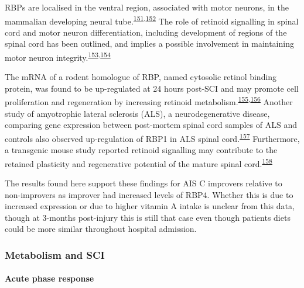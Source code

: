 \documentclass[
]{article}
\begin{document}
RBPs are localised in the ventral region, associated with motor neurons, in the mammalian developing neural tube.\textsuperscript{\protect\hyperlink{ref-pierani_sonic_1999}{151},\protect\hyperlink{ref-maden_retinoid-binding_1990}{152}}
The role of retinoid signalling in spinal cord and motor neuron differentiation, including development of regions of the spinal cord has been outlined, and implies a possible involvement in maintaining motor neuron integrity.\textsuperscript{\protect\hyperlink{ref-colbert_retinoid_1995}{153},\protect\hyperlink{ref-sockanathan_motor_1998}{154}}

The mRNA of a rodent homologue of RBP, named cytosolic retinol binding protein, was found to be up-regulated at 24 hours post-SCI and may promote cell proliferation and regeneration by increasing retinoid metabolism.\textsuperscript{\protect\hyperlink{ref-song_genechip_2001}{155},\protect\hyperlink{ref-hurst_complexity_1999}{156}}
Another study of amyotrophic lateral sclerosis (ALS), a neurodegenerative disease, comparing gene expression between post-mortem spinal cord samples of ALS and controls also observed up-regulation of RBP1 in ALS spinal cord.\textsuperscript{\protect\hyperlink{ref-malaspina_differential_2001}{157}}
Furthermore, a transgenic mouse study reported retinoid signalling may contribute to the retained plasticity and regenerative potential of the mature spinal cord.\textsuperscript{\protect\hyperlink{ref-haskell_retinoic_2002}{158}}

The results found here support these findings for AIS C improvers relative to non-improvers as improver had increased levels of RBP4.
Whether this is due to increased expression or due to higher vitamin A intake is unclear from this data, though at 3-months post-injury this is still that case even though patients diets could be more similar throughout hospital admission.

\hypertarget{metabolism-and-sci}{%
\subsubsection{Metabolism and SCI}\label{metabolism-and-sci}}

\hypertarget{acute-phase-response}{%
\paragraph{Acute phase response}\label{acute-phase-response}}
\end{document}
